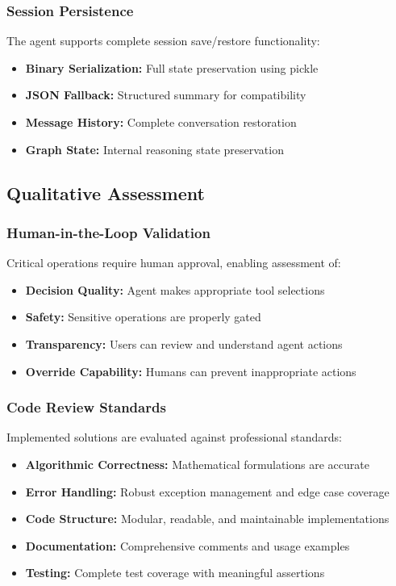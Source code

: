 \documentclass[12pt, a4paper]{article}
\begin{document}
\subsubsection{Session Persistence}
The agent supports complete session save/restore functionality:

\begin{itemize}
    \item \textbf{Binary Serialization:} Full state preservation using pickle
    \item \textbf{JSON Fallback:} Structured summary for compatibility
    \item \textbf{Message History:} Complete conversation restoration
    \item \textbf{Graph State:} Internal reasoning state preservation
\end{itemize}

\subsection{Qualitative Assessment}

\subsubsection{Human-in-the-Loop Validation}
Critical operations require human approval, enabling assessment of:

\begin{itemize}
    \item \textbf{Decision Quality:} Agent makes appropriate tool selections
    \item \textbf{Safety:} Sensitive operations are properly gated
    \item \textbf{Transparency:} Users can review and understand agent actions
    \item \textbf{Override Capability:} Humans can prevent inappropriate actions
\end{itemize}

\subsubsection{Code Review Standards}
Implemented solutions are evaluated against professional standards:

\begin{itemize}
    \item \textbf{Algorithmic Correctness:} Mathematical formulations are accurate
    \item \textbf{Error Handling:} Robust exception management and edge case coverage
    \item \textbf{Code Structure:} Modular, readable, and maintainable implementations
    \item \textbf{Documentation:} Comprehensive comments and usage examples
    \item \textbf{Testing:} Complete test coverage with meaningful assertions
\end{itemize}
\end{document}
